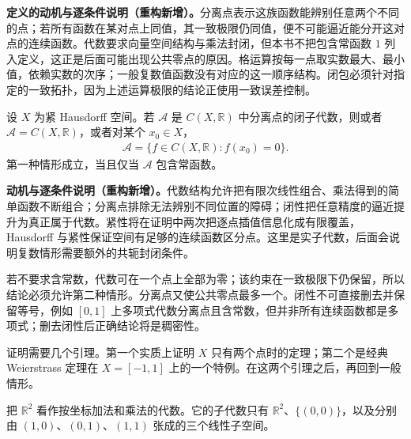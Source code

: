 \documentclass[../../main.tex]{subfiles}%
\begin{document}
\begin{remark}
\textbf{定义的动机与逐条件说明（重构新增）。}分离点表示这族函数能辨别任意两个不同的点；若所有函数在某对点上同值，其一致极限仍同值，便不可能逼近能分开这对点的连续函数。代数要求向量空间结构与乘法封闭，但本书不把包含常函数 $1$ 列入定义，这正是后面可能出现公共零点的原因。格运算按每一点取实数最大、最小值，依赖实数的次序；一般复数值函数没有对应的这一顺序结构。闭包必须针对指定的一致拓扑，因为上述运算极限的结论正使用一致误差控制。
\end{remark}
\begin{theorem}\label{theorem:ch04-real-stone-weierstrass}
设 $X$ 为紧 Hausdorff 空间。若 $\mathcal A$ 是 $C(X,\mathbb R)$ 中分离点的闭子代数，则或者 $\mathcal A=C(X,\mathbb R)$，或者对某个 $x_0\in X$，
\begin{align*}
\mathcal A=\{f\in C(X,\mathbb R):f(x_0)=0\}.
\end{align*}
第一种情形成立，当且仅当 $\mathcal A$ 包含常函数。
\end{theorem}
\begin{remark}
\textbf{动机与逐条件说明（重构新增）。}代数结构允许把有限次线性组合、乘法得到的简单函数不断组合；分离点排除无法辨别不同位置的障碍；闭性把任意精度的逼近提升为真正属于代数。紧性将在证明中两次把逐点插值信息化成有限覆盖，Hausdorff 与紧性保证空间有足够的连续函数区分点。这里是实子代数，后面会说明复数情形需要额外的共轭封闭条件。

若不要求含常数，代数可在一个点上全部为零；该约束在一致极限下仍保留，所以结论必须允许第二种情形。分离点又使公共零点最多一个。闭性不可直接删去并保留等号，例如 $[0,1]$ 上多项式代数分离点且含常数，但并非所有连续函数都是多项式；删去闭性后正确结论将是稠密性。
\end{remark}
证明需要几个引理。第一个实质上证明 $X$ 只有两个点时的定理；第二个是经典 Weierstrass 定理在 $X=[-1,1]$ 上的一个特例。在这两个引理之后，再回到一般情形。
\begin{lemma}\label{lemma:ch04-two-coordinate-algebras}
把 $\mathbb R^2$ 看作按坐标加法和乘法的代数。它的子代数只有 $\mathbb R^2$、$\{(0,0)\}$，以及分别由 $(1,0)$、$(0,1)$、$(1,1)$ 张成的三个线性子空间。
\end{lemma}
\end{document}

